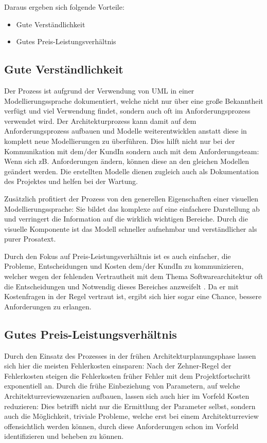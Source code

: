 Daraus ergeben sich folgende Vorteile:

\begin{itemize}
  \item Gute Verständlichkeit
  \item Gutes Preis-Leistungsverhältnis
\end{itemize}

\subsection{Gute Verständlichkeit}
Der Prozess ist aufgrund der Verwendung von UML in einer Modellierungssprache dokumentiert, welche nicht nur über eine große Bekanntheit verfügt und viel Verwendung findet, sondern auch oft im Anforderungsprozess verwendet wird. Der Architekturprozess kann damit auf dem Anforderungsprozess aufbauen und Modelle weiterentwicklen anstatt diese in komplett neue Modellierungen zu überführen. Dies hilft nicht nur bei der Kommunikation mit dem/der KundIn sondern auch mit dem Anforderungsteam: Wenn sich zB. Anforderungen ändern, können diese an den gleichen Modellen geändert werden. Die erstellten Modelle dienen zugleich auch als Dokumentation des Projektes und helfen bei der Wartung.

Zusätzlich profitiert der Prozess von den generellen Eigenschaften einer visuellen Modellierungssprache: Sie bildet das komplexe auf eine einfachere Darstellung ab und verringert die Information auf die wirklich wichtigen Bereiche. Durch die visuelle Komponente ist das Modell schneller aufnehmbar und verständlicher als purer Prosatext.

Durch den Fokus auf Preis-Leistungsverhältnis ist es auch einfacher, die Probleme, Entscheidungen und Kosten dem/der KundIn zu kommunizieren, welcher wegen der fehlenden Vertrautheit mit dem Thema Softwarearchitektur oft die Entscheidungen und Notwendig dieses Bereiches anzweifelt \cite[S. 8-9]{softarch}. Da er mit Kostenfragen in der Regel vertraut ist, ergibt sich hier sogar eine Chance, bessere Anforderungen zu erlangen.

\subsection{Gutes Preis-Leistungsverhältnis}
Durch den Einsatz des Prozesses in der frühen Architekturplanungsphase lassen sich hier die meisten Fehlerkosten einsparen: Nach der Zehner-Regel der Fehlerkosten steigen die Fehlerkosten früher Fehler mit dem Projektfortschritt exponentiell an. Durch die frühe Einbeziehung von Parametern, auf welche  Architekturreviewszenarien aufbauen, lassen sich auch hier im Vorfeld Kosten reduzieren: Dies betrifft nicht nur die Ermittlung der Parameter selbst, sondern auch die Möglichkeit, triviale Probleme, welche erst bei einem Architekturreview offensichtlich werden können, durch diese Anforderungen schon im Vorfeld identifizieren und beheben zu können.

